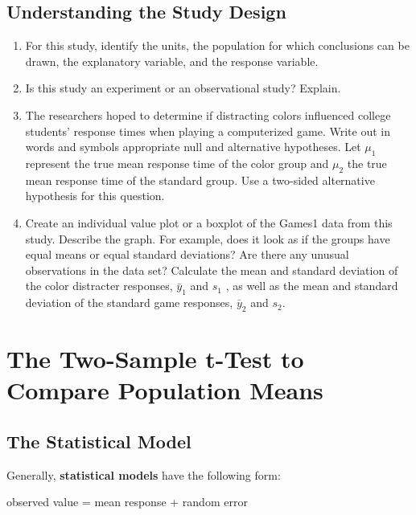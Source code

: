 \documentclass[
]{report}
\begin{document}
\hypertarget{understanding-the-study-design}{%
\subsection{Understanding the Study Design}\label{understanding-the-study-design}}

\begin{enumerate}
\def\labelenumi{\arabic{enumi}.}
\item
  For this study, identify the units, the population for which conclusions can be drawn, the explanatory variable, and the response variable.
\item
  Is this study an experiment or an observational study? Explain.
\item
  The researchers hoped to determine if distracting colors influenced college students' response times when playing a computerized game. Write out in words and symbols appropriate null and alternative hypotheses. Let \(\mu_1\) represent the true mean response time of the color group and \(\mu_2\) the true mean response time of the standard group. Use a two-sided alternative hypothesis for this question.
\item
  Create an individual value plot or a boxplot of the Games1 data from this study. Describe the graph. For example, does it look as if the groups have equal means or equal standard deviations? Are there any unusual observations in the data set? Calculate the mean and standard deviation of the color distracter responses, \(\bar{y}_1\) and \(s_1\) , as well as the mean and standard deviation of the standard game responses, \(\bar{y}_2\) and \(s_2\).
\end{enumerate}

\hypertarget{the-two-sample-t-test-to-compare-population-means}{%
\section{The Two-Sample t-Test to Compare Population Means}\label{the-two-sample-t-test-to-compare-population-means}}

\hypertarget{the-statistical-model}{%
\subsection{The Statistical Model}\label{the-statistical-model}}

Generally, \textbf{statistical models} have the following form:

observed value = mean response + random error
\end{document}
